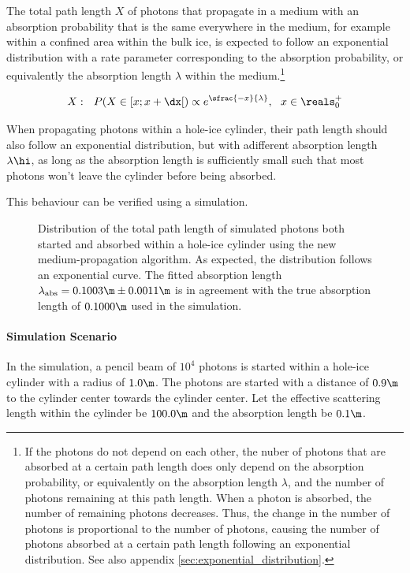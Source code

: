The total path length $X$ of photons that propagate in a medium with an absorption probability that is the same everywhere in the medium, for example within a confined area within the bulk ice, is expected to follow an exponential distribution with a rate parameter corresponding to the absorption probability, or equivalently the absorption length $\lambda$ within the medium.\footnote{If the photons do not depend on each other, the nuber of photons that are absorbed at a certain path length does only depend on the absorption probability, or equivalently on the absorption length $\lambda$, and the number of photons remaining at this path length. When a photon is absorbed, the number of remaining photons decreases. Thus, the change in the number of photons is proportional to the number of photons, causing the number of photons absorbed at a certain path length following an exponential distribution. See also appendix \ref{sec:exponential_distribution}.}

\begin{equation}
  X: \ \ P(X \in [x; x + \dx[) \propto e^{\sfrac{-x}{\lambda}}, \ \ x \in \reals^+_0
\end{equation}

When propagating photons within a hole-ice cylinder, their path length should also follow an exponential distribution, but with adifferent absorption length $\lambda\hi$, as long as the absorption length is sufficiently small such that most photons won't leave the cylinder before being absorbed.

This behaviour can be verified using a simulation.


\begin{figure}[htb]
  \caption{Distribution of the total path length of simulated photons both started and absorbed within a hole-ice cylinder using the new medium-propagation algorithm. As expected, the distribution follows an exponential curve. The fitted absorption length $\lambda_\text{abs}=0.1003\m \pm 0.0011\m$ is in agreement with the true absorption length of $0.1000\m$ used in the simulation.}
\end{figure}

\paragraph{Simulation Scenario} In the simulation, a pencil beam of $10^4$ photons is started within a hole-ice cylinder with a radius of $1.0\m$. The photons are started with a distance of $0.9\m$ to the cylinder center towards the cylinder center. Let the effective scattering length within the cylinder be $100.0\m$ and the absorption length be $0.1\m$.

